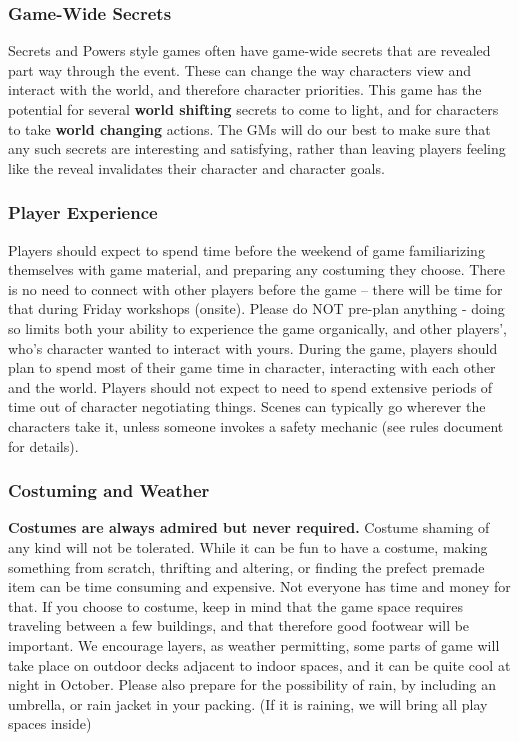 \documentclass[sheet]{GL2020}
\begin{document}
\subsubsection{Game-Wide Secrets}
Secrets and Powers style games often have game-wide secrets that are revealed part way through the event. These can change the way characters view and interact with the world, and therefore character priorities. This game has the potential for several \textbf{world shifting} secrets to come to light, and for characters to take \textbf{world changing} actions. The GMs will do our best to make sure that any such secrets are interesting and satisfying, rather than leaving players feeling like the reveal invalidates their character and character goals. 

\subsubsection{Player Experience}
Players should expect to spend time before the weekend of game familiarizing themselves with game material, and preparing any costuming they choose. There is no need to connect with other players before the game -- there will be time for that during Friday workshops (onsite). Please do NOT pre-plan anything - doing so limits both your ability to experience the game organically, and other players', who's character wanted to interact with yours.  During the game, players should plan to spend most of their game time in character, interacting with each other and the world. Players should not expect to need to spend extensive periods of time out of character negotiating things. Scenes can typically go wherever the characters take it, unless someone invokes a safety mechanic (see rules document for details).

\subsubsection{Costuming and Weather} 
\textbf{Costumes are always admired but never required.} Costume shaming of any kind will not be tolerated. While it can be fun to have a costume, making something from scratch, thrifting and altering, or finding the prefect premade item can be time consuming and expensive. Not everyone has time and money for that. If you choose to costume, keep in mind that the game space requires traveling between a few buildings, and that therefore good footwear will be important. We encourage layers, as weather permitting, some parts of game will take place on outdoor decks adjacent to indoor spaces, and it can be quite cool at night in October. Please also prepare for the possibility of rain, by including an umbrella, or rain jacket in your packing. (If it is raining, we will bring all play spaces inside)
\end{document}
